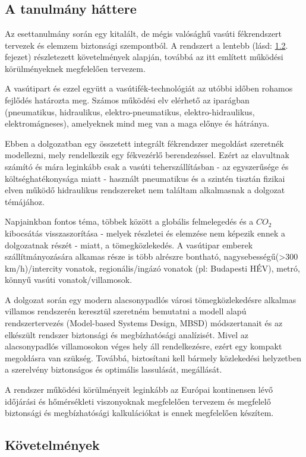 \chapter{\caseStudy}

\section{A tanulmány háttere}
Az esettanulmány során egy kitalált, de mégis valósághű vasúti fékrendszert tervezek és elemzem biztonsági szempontból.
A rendszert a lentebb (lásd: \ref{requirements}. fejezet) részletezett követelmények alapján, továbbá az itt említett működési körülményeknek megfelelően tervezem.

A vasútipart és ezzel együtt a vasútifék-technológiát az utóbbi időben rohamos fejlődés határozta meg. 
Számos működési elv elérhető az iparágban (pneumatikus, hidraulikus, elektro-pneumatikus, elektro-hidraulikus, elektromágneses), amelyeknek mind meg van a maga előnye és hátránya.

Ebben a dolgozatban egy összetett integrált fékrendszer megoldást szeretnék modellezni, mely rendelkezik egy fékvezérlő berendezéssel.
Ezért az elavultnak számító és mára leginkább csak a vasúti teherszállításban - az egyszerűsége és költséghatékonysága miatt - használt pneumatikus és a szintén tisztán fizikai elven működő hidraulikus rendszereket nem találtam alkalmasnak a dolgozat témájához.

Napjainkban fontos téma, többek között a globális felmelegedés és a ${CO}_2$ kibocsátás visszaszorítása - melyek részletei és elemzése nem képezik ennek a dolgozatnak részét - miatt, a tömegközlekedés.
A vasútipar emberek szállítmányozására alkamas része is több alrészre bontható, nagysebességű(>300 km/h)/intercity vonatok, 
regionális/ingázó vonatok (pl: Budapesti HÉV), metró, könnyű vasúti vonatok/villamosok.

A dolgozat során egy modern alacsonypadlós városi tömegközlekedésre alkalmas villamos rendszerén keresztül szeretném bemutatni a modell alapú rendszertervezés (Model-based Systems Design, MBSD) módszertanait és az elkészült rendszer biztonsági és megbízhatósági analízisét. 
Mivel az alacsonypadlós villamosokon véges hely áll rendelkezésre, ezért egy kompakt megoldásra van szükség. 
Továbbá, biztosítani kell bármely közlekedési helyzetben a szerelvény biztonságos és optimális lassulását, megállását.

A rendszer működési körülményeit leginkább az Európai kontinensen lévő időjárási és hőmérsékleti viszonyoknak megfelelően tervezem és megfelelő biztonsági és megbízhatósági kalkulációkat is ennek megfelelően készítem.

\section{Követelmények} \label{requirements}
